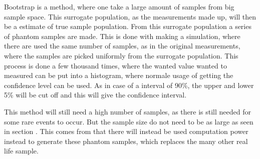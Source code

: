 Bootstrap is a method, where one take a large amount of samples from big sample space. This surrogate population, as the measurements made up, will then be a estimate of true sample population. From this surrogate population a series of phantom samples are made. This is done with making a simulation, where there are used the same number of samples, as in the original measurements, where the samples are picked uniformly from the surrogate population. This process is done a few thousand times, where the wanted value wanted to measured can be put into a histogram, where normale usage of getting the confidence level can be used. As in case of a interval of 90\%, the upper and lower 5\% will be cut off and this will give the confidence interval.

This method will still need a high number of samples, as there is still needed for some rare events to occur. But the sample size do not need to be as large as seen in section . This comes from that there will instead be used computation power instead to generate these phantom samples, which replaces the many other real life sample. 







